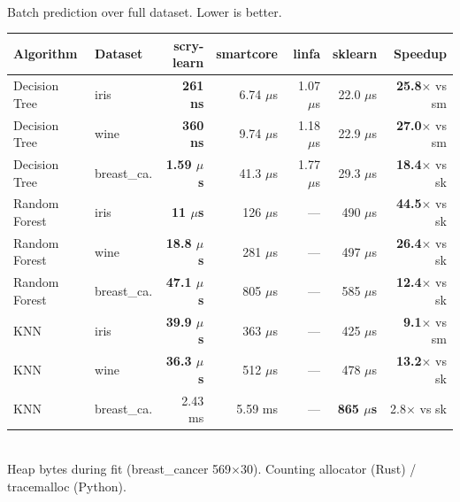 \documentclass[11pt,a4paper]{article}
\newcommand{\hdr}[1]{\cellcolor{headerblue}\textbf{\color{darktext}#1}}
\newcommand{\win}[1]{\textbf{\color{wingreen}#1}}
\newcommand{\us}{$\mu$s}
\newcommand{\speedup}[1]{{\footnotesize\color{wingreen}\textbf{#1$\times$}}}
\newcommand{\slower}[1]{{\footnotesize\color{losered}#1$\times$}}
\begin{document}
\\[2pt]
{\small Batch prediction over full dataset. Lower is better.}

\vspace{4pt}
\begin{table}[H]
\centering
\small
\setlength{\tabcolsep}{4pt}
\renewcommand{\arraystretch}{1.2}
\begin{tabular}{llrrrrr}
\toprule
\rowcolor{headerblue}
\hdr{Algorithm} & \hdr{Dataset} & \hdr{scry-learn} & \hdr{smartcore} & \hdr{linfa} & \hdr{sklearn} & \hdr{Speedup} \\
\midrule
Decision Tree  & iris           & \win{261 ns}   & 6.74 \us       & 1.07 \us       & 22.0 \us       & \speedup{25.8} vs sm \\
\rowcolor{lightgray}
Decision Tree  & wine           & \win{360 ns}   & 9.74 \us       & 1.18 \us       & 22.9 \us       & \speedup{27.0} vs sm \\
Decision Tree  & breast\_ca.    & \win{1.59 \us} & 41.3 \us       & 1.77 \us       & 29.3 \us       & \speedup{18.4} vs sk \\
\midrule
Random Forest  & iris           & \win{11 \us}   & 126 \us        & ---            & 490 \us        & \speedup{44.5} vs sk \\
\rowcolor{lightgray}
Random Forest  & wine           & \win{18.8 \us} & 281 \us        & ---            & 497 \us        & \speedup{26.4} vs sk \\
Random Forest  & breast\_ca.    & \win{47.1 \us} & 805 \us        & ---            & 585 \us        & \speedup{12.4} vs sk \\
\midrule
KNN            & iris           & \win{39.9 \us} & 363 \us        & ---            & 425 \us        & \speedup{9.1} vs sm \\
\rowcolor{lightgray}
KNN            & wine           & \win{36.3 \us} & 512 \us        & ---            & 478 \us        & \speedup{13.2} vs sk \\
KNN            & breast\_ca.    & 2.43 ms        & 5.59 ms        & ---            & \win{865 \us}  & \slower{2.8} vs sk \\
\bottomrule
\end{tabular}
\end{table}

\\[2pt]
{\small Heap bytes during fit (breast\_cancer 569$\times$30). Counting allocator (Rust) / tracemalloc (Python).}
\end{document}

